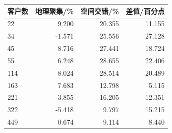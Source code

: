 \begin{tabular*}{0.84\linewidth}{@{\extracolsep{\fill}}lrrr@{}}
\toprule
客户数 & 地理聚集/\% & 空间交错/\% & 差值/百分点 \\
\midrule
22 & 9.200 & 20.355 & 11.155 \\
34 & -1.571 & 25.556 & 27.128 \\
45 & 8.716 & 27.441 & 18.724 \\
55 & 6.248 & 28.655 & 22.406 \\
114 & 8.024 & 28.514 & 20.489 \\
163 & 7.683 & 12.798 & 5.115 \\
221 & 3.855 & 16.205 & 12.351 \\
322 & -5.418 & 9.797 & 15.215 \\
449 & 0.674 & 9.114 & 8.440 \\
\bottomrule
\end{tabular*}
